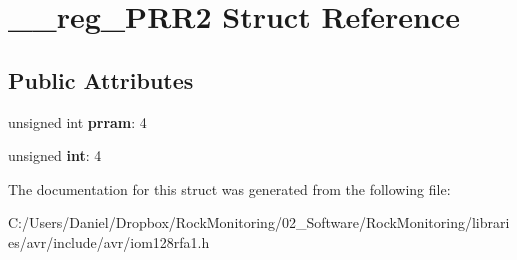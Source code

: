 \hypertarget{struct____reg___p_r_r2}{}\section{\+\_\+\+\_\+reg\+\_\+\+P\+R\+R2 Struct Reference}
\label{struct____reg___p_r_r2}
\subsection*{Public Attributes}
\begin{DoxyCompactItemize}
\item 
unsigned int {\bfseries prram}\+: 4\hypertarget{struct____reg___p_r_r2_ad08293ee0728b4dc089c9a27cb506e64}{}\label{struct____reg___p_r_r2_ad08293ee0728b4dc089c9a27cb506e64}

\item 
unsigned {\bfseries int}\+: 4\hypertarget{struct____reg___p_r_r2_a3ec32af2024a3395159963b8380ced94}{}\label{struct____reg___p_r_r2_a3ec32af2024a3395159963b8380ced94}

\end{DoxyCompactItemize}


The documentation for this struct was generated from the following file\+:\begin{DoxyCompactItemize}
\item 
C\+:/\+Users/\+Daniel/\+Dropbox/\+Rock\+Monitoring/02\+\_\+\+Software/\+Rock\+Monitoring/libraries/avr/include/avr/iom128rfa1.\+h\end{DoxyCompactItemize}
